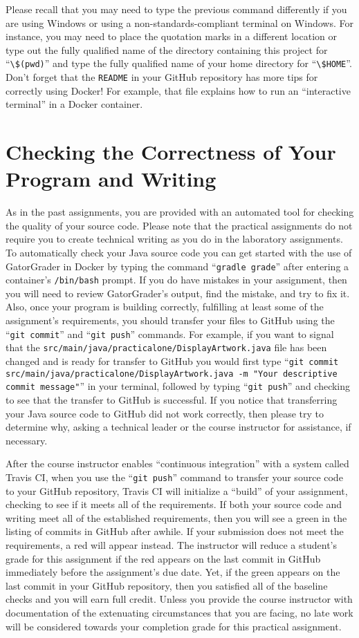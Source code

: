 \documentclass[11pt]{article}
\newcommand{\mainprogramsource}{\lstinline{src/main/java/practicalone/DisplayArtwork.java}}
\newcommand{\gatorgraderstart}{\command{gradle grade}}
\newcommand{\gitcommit}{\command{git commit}}
\newcommand{\gitpush}{\command{git push}}
\newcommand{\gitcommitmainprogram}{\command{git commit src/main/java/practicalone/DisplayArtwork.java -m "Your
descriptive commit message"}}
\newcommand{\command}[1]{``\lstinline{#1}''}
\newcommand{\program}[1]{\lstinline{#1}}
\newcommand{\step}[1]{``{#1}''}
\newcommand{\checkmark}{\ding{51}}
\newcommand{\naughtmark}{\ding{55}}
\begin{document}
Please recall that you may need to type the previous command differently if you
are using Windows or using a non-standards-compliant terminal on Windows. For
instance, you may need to place the quotation marks in a different location or
type out the fully qualified name of the directory containing this project for
\command{\$(pwd)} and type the fully qualified name of your home directory for
\command{\$HOME}. Don't forget that the \program{README} in your GitHub
repository has more tips for correctly using Docker! For example, that file
explains how to run an ``interactive terminal'' in a Docker container.

\section*{Checking the Correctness of Your Program and Writing}

As in the past assignments, you are provided with an automated tool for checking
the quality of your source code. Please note that the practical assignments do
not require you to create technical writing as you do in the laboratory
assignments. To automatically check your Java source code you can get started
with the use of GatorGrader in Docker by typing the command \gatorgraderstart{}
after entering a container's \program{/bin/bash} prompt. If you do have mistakes
in your assignment, then you will need to review GatorGrader's output, find the
mistake, and try to fix it. Also, once your program is building correctly,
fulfilling at least some of the assignment's requirements, you should transfer
your files to GitHub using the \gitcommit{} and \gitpush{} commands. For
example, if you want to signal that the \mainprogramsource{} file has been
changed and is ready for transfer to GitHub you would first type
\gitcommitmainprogram{} in your terminal, followed by typing \gitpush{} and
checking to see that the transfer to GitHub is successful. If you notice that
transferring your Java source code to GitHub did not work correctly, then please
try to determine why, asking a technical leader or the course instructor for
assistance, if necessary.

After the course instructor enables \step{continuous integration} with a system
called Travis CI, when you use the \gitpush{} command to transfer your source
code to your GitHub repository, Travis CI will initialize a \step{build} of your
assignment, checking to see if it meets all of the requirements. If both your
source code and writing meet all of the established requirements, then you will
see a green \checkmark{} in the listing of commits in GitHub after awhile. If
your submission does not meet the requirements, a red \naughtmark{} will appear
instead. The instructor will reduce a student's grade for this assignment if the
red \naughtmark{} appears on the last commit in GitHub immediately before the
assignment's due date. Yet, if the green \checkmark{} appears on the last commit
in your GitHub repository, then you satisfied all of the baseline checks and you
will earn full credit. Unless you provide the course instructor with
documentation of the extenuating circumstances that you are facing, no late work
will be considered towards your completion grade for this practical assignment.
\end{document}
